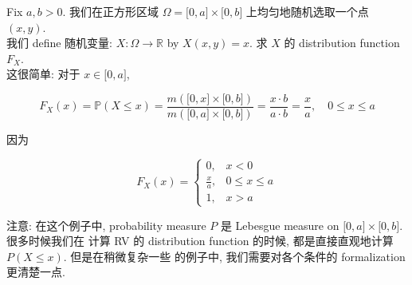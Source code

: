 \begin{example}

Fix \(\mathit{a},\mathit{b} > 0\). 我们在正方形区域 \(\Omega = \lbrack 0,\mathit{a}\rbrack \times \lbrack 0,\mathit{b}\rbrack\) 上均匀地随机选取一个点 \((\mathit{x},\mathit{y})\).\\
我们 define 随机变量: \(\mathit{X}:\Omega\rightarrow\mathbb{R}\) by \(\mathit{X}(\mathit{x},\mathit{y}) = \mathit{x}\). 求 \(\mathit{X}\) 的 distribution function \(\mathit{F}_{\mathit{X}}\).\\
这很简单: 对于 \(\mathit{x} \in \lbrack 0,\mathit{a}\rbrack\),

\[\mathit{F}_{\mathit{X}}(\mathit{x}) = \mathbb{P}(\mathit{X} \leq \mathit{x}) = \frac{\mathit{m}(\lbrack 0,\mathit{x}\rbrack \times \lbrack 0,\mathit{b}\rbrack)}{\mathit{m}(\lbrack 0,\mathit{a}\rbrack \times \lbrack 0,\mathit{b}\rbrack)} = \frac{\mathit{x} \cdot \mathit{b}}{\mathit{a} \cdot \mathit{b}} = \frac{\mathit{x}}{\mathit{a}},\quad 0 \leq \mathit{x} \leq \mathit{a}\]

因为

\[\mathit{F}_{\mathit{X}}(\mathit{x}) = \left\{ \begin{matrix}
{0,} & {\mathit{x} < 0} \\
{\frac{\mathit{x}}{\mathit{a}},} & {0 \leq \mathit{x} \leq \mathit{a}} \\
{1,} & {\mathit{x} > \mathit{a}}
\end{matrix} \right.\]

注意: 在这个例子中, probability measure \(\mathit{P}\) 是 Lebesgue measure on \(\lbrack 0,\mathit{a}\rbrack \times \lbrack 0,\mathit{b}\rbrack\). 很多时候我们在 计算 RV 的 distribution function 的时候, 都是直接直观地计算 \(\mathit{P}(\mathit{X} \leq \mathit{x})\). 但是在稍微复杂一些 的例子中, 我们需要对各个条件的 formalization 更清楚一点.

\end{example}

